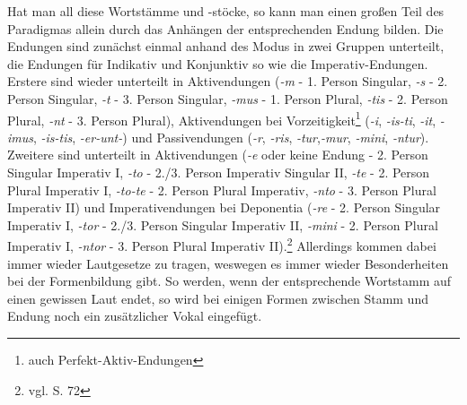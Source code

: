 \documentclass[fontsize=12pt,abstract=on,titlepage,bibliography=totoc,ngerman,listof=totoc]{scrreprt}
\begin{document}
Hat man all diese Wortstämme und -stöcke, so kann man einen großen Teil des Paradigmas allein durch das Anhängen der entsprechenden Endung bilden. Die Endungen sind zunächst einmal anhand des Modus in zwei Gruppen unterteilt, die Endungen für Indikativ und Konjunktiv so wie die Imperativ-Endungen. Erstere sind wieder unterteilt in Aktivendungen (\textit{-m} - 1. Person Singular, \textit{-s} - 2. Person Singular, \textit{-t} - 3. Person Singular, \textit{-mus} - 1. Person Plural, \textit{-tis} - 2. Person Plural, \textit{-nt} - 3. Person Plural), Aktivendungen bei Vorzeitigkeit\footnote{auch Perfekt-Aktiv-Endungen} (\textit{-i}, \textit{-is-ti}, \textit{-it}, \textit{-imus}, \textit{-is-tis}, \textit{-er-unt-}) und Passivendungen (\textit{-r}, \textit{-ris}, \textit{-tur},\textit{-mur}, \textit{-mini}, \textit{-ntur}). Zweitere sind unterteilt in Aktivendungen (\textit{-e} oder keine Endung - 2. Person Singular Imperativ I, \textit{-to} - 2./3. Person Imperativ Singular II, \textit{-te} - 2. Person Plural Imperativ I, \textit{-to-te} - 2. Person Plural Imperativ, \textit{-nto} - 3. Person Plural Imperativ II) und Imperativendungen bei Deponentia (\textit{-re} - 2. Person Singular Imperativ I, \textit{-tor} - 2./3. Person Singular Imperativ II, \textit{-mini} - 2. Person Plural Imperativ I, \textit{-ntor} - 3. Person Plural Imperativ II).\footnote{vgl. \cite{BAYER-LINDAUER1994} S. 72} Allerdings kommen dabei immer wieder Lautgesetze zu tragen, weswegen es immer wieder Besonderheiten bei der Formenbildung gibt. So werden, wenn der entsprechende Wortstamm auf einen gewissen Laut endet, so wird bei einigen Formen zwischen Stamm und Endung noch ein zusätzlicher Vokal eingefügt. \par
\end{document}
